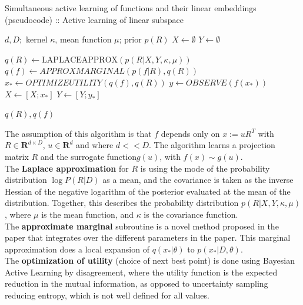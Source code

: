 \documentclass[a4paper,12pt,twoside,openright]{report}
\begin{document}
\begin{algorithm}
\caption{Simultaneous active learning of functions and their linear embeddings (pseudocode) :: Active learning of linear subspace \citep{Garnett2013}}

\begin{algorithmic} 
\REQUIRE $d, D;$ kernel $\kappa$, mean function $\mu$; prior $p(R)$ 
\STATE $X \leftarrow \emptyset$
\STATE $Y \leftarrow \emptyset$

\STATE $ q(R) \leftarrow \text{LAPLACEAPPROX}( p(R | X, Y, \kappa, \mu) ) $
\STATE $ q(f) \leftarrow  APPROXMARGINAL( p(f | R), q(R)) $
\STATE $ x_* \leftarrow OPTIMIZEUTILITY( q(f), q(R) )$
\STATE $ y \leftarrow OBSERVE( f( x_* ) ) $
\STATE $ X \leftarrow [X; x_*] $
\STATE $ Y \leftarrow[Y; y_*] $
\ENDWHILE

\RETURN $q(R), q(f)$
\end{algorithmic}

\end{algorithm}

\citep{Garnett2013} The assumption of this algorithm is that $f$ depends only on $ x := uR^T $ with $ R \in \mathbf{R}^{d \times D}$, $ u \in \mathbf{R}^d $ and where $d << D$. 
The algorithm learns a projection matrix $R$ and the surrogate function$g(u)$, with $f(x) \sim g(u) $. \\

The \textbf{Laplace approximation} for $R$ is using the mode of the probability distribution $\log P (R | D) $ as a mean, and the covariance is taken as the inverse Hessian of the negative logarithm of the posterior evaluated at the mean of the distribution.
Together, this describes the probability distribution $p(R|X, Y, \kappa, \mu )$, where $\mu$ is the mean function, and $\kappa$ is the covariance function.\\

The \textbf{approximate marginal} subroutine is a novel method proposed in the paper that integrates over the different parameters in the paper.
This marginal approximation does a local expansion of $q(x_* | \theta) $ to $p(x_* | D, \theta)$. \\

The \textbf{optimization of utility} (choice of next best point) is done using Bayesian Active Learning by disagreement, where the utility function is the expected reduction in the mutual information, as opposed to uncertainty sampling reducing entropy, which  is not well defined for all values. \\
\end{document}

